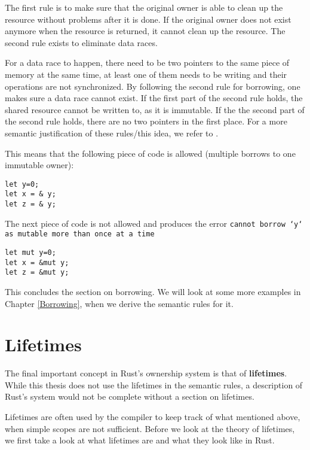 The first rule is to make sure that the original owner is able to clean up the resource without problems after it is done. If the original owner does not exist anymore when the resource is returned, it cannot clean up the resource. The second rule exists to eliminate data races. 

For a data race to happen, there need to be two pointers to the same piece of memory at the same time, at least one of them needs to be writing and their operations are not synchronized. By following the second rule for borrowing, one makes sure a data race cannot exist. If the first part of the second rule holds, the shared resource cannot be written to, as it is immutable. If the the second part of the second rule holds, there are no two pointers in the first place. For a more semantic justification of these rules/this idea, we refer to \cite{boyland2003checking}.

This means that the following piece of code is allowed (multiple borrows to one immutable owner):

\begin{verbatim}
let y=0;
let x = & y; 
let z = & y;
\end{verbatim}

The next piece of code is not allowed and produces the error \texttt{cannot borrow `y` as mutable more than once at a time}

\begin{verbatim}
let mut y=0;
let x = &mut y; 
let z = &mut y;
\end{verbatim}

This concludes the section on borrowing. We will look at some more examples in Chapter \ref{Borrowing}, when we derive the semantic rules for it. 

\section{Lifetimes}
The final important concept in Rust's ownership system is that of \textbf{lifetimes}. While this thesis does not use the lifetimes in the semantic rules, a description of Rust's system would not be complete without a section on lifetimes. 

Lifetimes are often used by the compiler to keep track of what mentioned above, when simple scopes are not sufficient. Before we look at the theory of lifetimes, we first take a look at what lifetimes are and what they look like in Rust.
 
